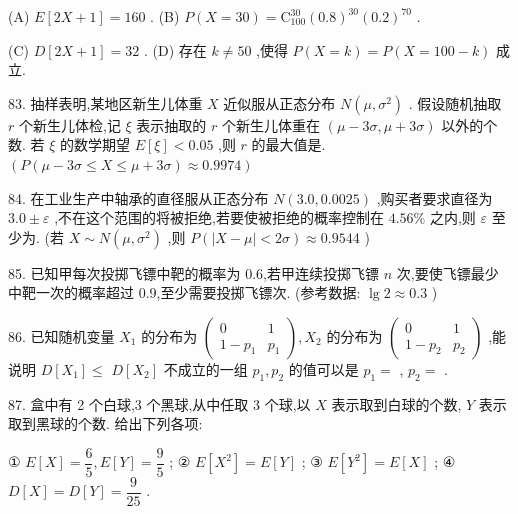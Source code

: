 (A) $E\left\lbrack  {{2X} + 1}\right\rbrack   = {160}$ . (B) $P\left( {X = {30}}\right)  = {\mathrm{C}}_{100}^{30}{\left( {0.8}\right) }^{30}{\left( {0.2}\right) }^{70}$ .

(C) $D\left\lbrack  {{2X} + 1}\right\rbrack   = {32}$ . (D) 存在 $k \neq  {50}$ ,使得 $P\left( {X = k}\right)  = P\left( {X = {100} - k}\right)$ 成立.

83. 抽样表明,某地区新生儿体重 $X$ 近似服从正态分布 $N\left( {\mu ,{\sigma }^{2}}\right)$ . 假设随机抽取 $r$ 个新生儿体检,记 $\xi$ 表示抽取的 $r$ 个新生儿体重在 $\left( {\mu  - {3\sigma },\mu  + {3\sigma }}\right)$ 以外的个数. 若 $\xi$ 的数学期望 $E\left\lbrack  \xi \right\rbrack   < {0.05}$ ,则 $r$ 的最大值是\blkda{}. $\left( {P\left( {\mu  - {3\sigma } \leq  X \leq  \mu  + {3\sigma }}\right)  \approx  {0.9974}}\right)$

84. 在工业生产中轴承的直径服从正态分布 $N\left( {{3.0},{0.0025}}\right)$ ,购买者要求直径为 ${3.0} \pm  \varepsilon$ ,不在这个范围的将被拒绝,若要使被拒绝的概率控制在 ${4.56}\%$ 之内,则 $\varepsilon$ 至少为\blkda{}. (若 $X \sim  N\left( {\mu ,{\sigma }^{2}}\right)$ ,则 $P\left( {\left| {X - \mu }\right|  < {2\sigma }}\right)  \approx  {0.9544}$ )

85. 已知甲每次投掷飞镖中靶的概率为 0.6,若甲连续投掷飞镖 $n$ 次,要使飞镖最少中靶一次的概率超过 0.9,至少需要投掷飞镖\blkda{}次. (参考数据: $\lg 2 \approx  {0.3}$ )

86. 已知随机变量 ${X}_{1}$ 的分布为 $\left( \begin{matrix} 0 & 1 \\  1 - {p}_{1} & {p}_{1} \end{matrix}\right) ,{X}_{2}$ 的分布为 $\left( \begin{matrix} 0 & 1 \\  1 - {p}_{2} & {p}_{2} \end{matrix}\right)$ ,能说明 $D\left\lbrack  {X}_{1}\right\rbrack   \leq$  $D\left\lbrack  {X}_{2}\right\rbrack$ 不成立的一组 ${p}_{1},{p}_{2}$ 的值可以是 ${p}_{1} =$ \blkda{}, ${p}_{2} =$ \blkda{}.

87. 盒中有 2 个白球,3 个黑球,从中任取 3 个球,以 $X$ 表示取到白球的个数, $Y$ 表示取到黑球的个数. 给出下列各项:

① $E\left\lbrack  X\right\rbrack   = \dfrac{6}{5},E\left\lbrack  Y\right\rbrack   = \dfrac{9}{5}$ ; ② $E\left\lbrack  {X}^{2}\right\rbrack   = E\left\lbrack  Y\right\rbrack$ ; ③ $E\left\lbrack  {Y}^{2}\right\rbrack   = E\left\lbrack  X\right\rbrack$ ; ④ $D\left\lbrack  X\right\rbrack   = D\left\lbrack  Y\right\rbrack   = \dfrac{9}{25}$ .

